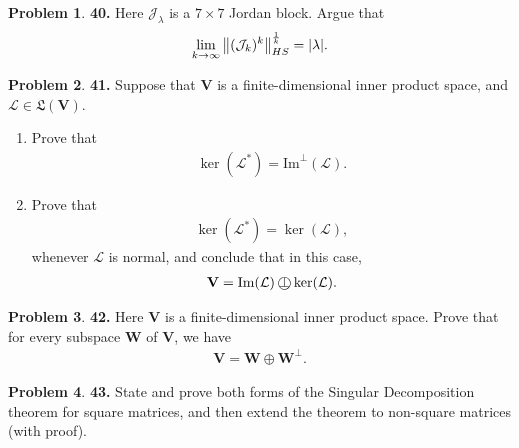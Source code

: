 \documentclass{book}
\theoremstyle{definition}
\newtheorem*{prob*}{Problem}
\newcommand{\V}{\mathbf{V}}
\newcommand{\W}{\mathbf{W}}
\newcommand*{\operp}{\perp\mkern-20.7mu\bigcirc}
\newcommand{\lag}{\mathcal{L}}
\newcommand{\ima}{\text{Im}}
\newcommand{\jor}{\mathcal{J}}
\newcommand{\LL}{\mathfrak{L}}
\begin{document}
\newpage


\begin{prob*}\textbf{40.} Here $\jor_\lambda$ is a $7\times 7$ Jordan block. Argue that
	\begin{align*}
	\lim_{k\to\infty} \norm{(\jor_k)^k}^{\frac{1}{k}}_{HS} = \abs{\lambda}.
	\end{align*}
	
\end{prob*}





\newpage



\begin{prob*}\textbf{41.} Suppose that $\V$ is a finite-dimensional inner product space, and $\lag \in \LL(\V)$. 
	
	\begin{enumerate}
		\item Prove that 
		\begin{align*}
		\ker(\lag^*) = \ima^\perp(\lag).
		\end{align*}
		
		
		\item Prove that 
		\begin{align*}
		\ker(\lag^*) = \ker(\lag),
		\end{align*}
		whenever $\lag$ is normal, and conclude that in this case, 
		\begin{align*}
		\V = \ima(\lag) \operp \ker(\lag).
		\end{align*}
	\end{enumerate}
	
\end{prob*}






\newpage


\begin{prob*}\textbf{42.} Here $\V$ is a finite-dimensional inner product space. Prove that for every subspace $\W$ of $\V$, we have
	\begin{align*}
	\V = \W \oplus \W^\perp.
	\end{align*}

\end{prob*}





\newpage



\begin{prob*}\textbf{43.} State and prove both forms of the Singular Decomposition theorem for square matrices, and then extend the theorem to non-square matrices (with proof). 
	
\end{prob*}
\end{document}
